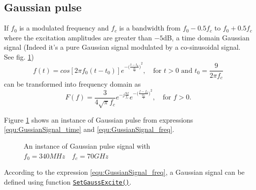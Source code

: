     \subsection{Gaussian pulse} \label{subsec:Gaussian pulse}
If $f_0$ is a modulated frequency and $f_c$ is a bandwidth from $f_0-0.5f_c$ to $f_0+0.5f_c$ where the excitation amplitudes are greater than $-5$dB, a time domain Gaussian signal (Indeed it's a pure Gaussian signal modulated by a co-sinusoidal signal. See fig. \ref{fig:GaussInpulseTheory})
\begin{equation}\label{equ:GussianSignal_time}
 f(t)=cos[2\pi f_0(t-t_0)]e^{-{\big(\frac{t-t_0}{\frac{t0}{3}}\big)}^2}, \quad \text{for } t>0 \text{ and }t_0=\frac{9}{2\pi f_c}
\end{equation}
can be transformed into frequency domain as
\begin{equation}\label{equ:GussianSignal_freq}
F(f)=\frac{3}{4\sqrt{\pi}f_c}e^{-j\frac{9f}{f_c}}e^{-{\big(\frac{f-f_0}{\frac{2f_c}{3}}\big)}^2},\quad \text{for } f>0 .
\end{equation}

Figure \ref{fig:GaussInpulseTheory} shows an instance of Gaussian pulse from expressions \ref{equ:GussianSignal_time} and \ref{equ:GussianSignal_freq}.
    \begin{figure}[hbt]
\centering
{}
\caption[Gaussian pulse signal]{An instance of Gaussian pulse signal with $f_0=340MHz \quad f_c=70GHz$}
\label{fig:GaussInpulseTheory}
    \end{figure}
According to the expression \ref{equ:GussianSignal_freq}, a Gaussian signal can be defined using function \hyperref[func:SetGaussExcite]{\texttt{SetGaussExcite()}}.

